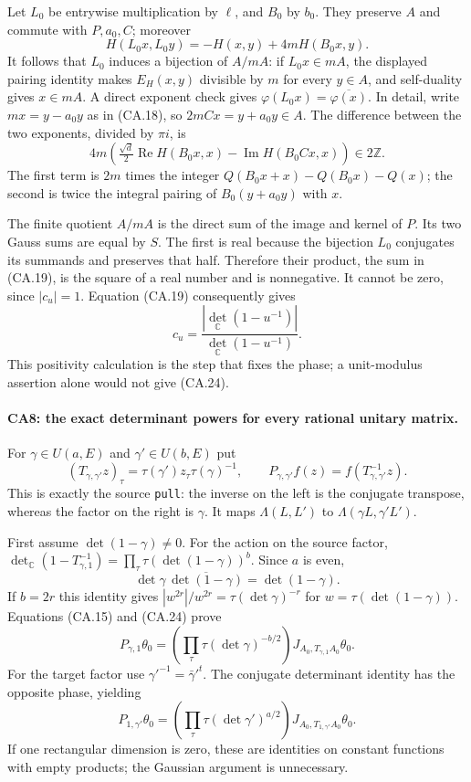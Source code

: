 Let $L_0$ be entrywise multiplication by $\ell$, and $B_0$ by $b_0$.
They preserve $A$ and commute with $P,a_0,C$; moreover
\[
 H(L_0x,L_0y)=-H(x,y)+4mH(B_0x,y).
\]
It follows that $L_0$ induces a bijection of $A/mA$: if
$L_0x\in mA$, the displayed pairing identity makes
$E_H(x,y)$ divisible by $m$ for every $y\in A$, and self-duality
gives $x\in mA$. A direct exponent check gives
$\varphi(L_0x)=\overline{\varphi(x)}$. In detail, write
$mx=y-a_0y$ as in (CA.18), so $2mCx=y+a_0y\in A$.
The difference between the two exponents, divided by $\pi i$, is
\[
 4m\left(\tfrac{\sqrt d}{2}\operatorname{Re}H(B_0x,x)
                 -\operatorname{Im}H(B_0Cx,x)\right)\in2\mathbb Z.
\]
The first term is $2m$ times the integer
$Q(B_0x+x)-Q(B_0x)-Q(x)$; the second is twice the integral
pairing of $B_0(y+a_0y)$ with $x$.

The finite quotient $A/mA$ is the direct sum of the image and
kernel of $P$. Its two Gauss sums are equal by $S$. The first is
real because the bijection $L_0$ conjugates its summands and
preserves that half. Therefore their product, the sum in (CA.19),
is the square of a real number and is nonnegative. It cannot be
zero, since $|c_u|=1$. Equation (CA.19) consequently gives
\[
 c_u=\frac{|\det_{\mathbb C}(1-u^{-1})|}
               {\det_{\mathbb C}(1-u^{-1})}.
 \tag{CA.24}
\]
This positivity calculation is the step that fixes the phase; a
unit-modulus assertion alone would not give (CA.24).

\paragraph{CA8: the exact determinant powers for every rational unitary matrix.}
For $\gamma\in U(a,E)$ and $\gamma'\in U(b,E)$ put
\[
 (T_{\gamma,\gamma'}z)_\tau
       =\tau(\gamma')z_\tau\tau(\gamma)^{-1},\qquad
 P_{\gamma,\gamma'}f(z)=f(T_{\gamma,\gamma'}^{-1}z).
 \tag{CA.25}
\]
This is exactly the source \texttt{pull}: the inverse on the left
is the conjugate transpose, whereas the factor on the right is
$\gamma$. It maps $\Lambda(L,L')$ to
$\Lambda(\gamma L,\gamma'L')$.

First assume $\det(1-\gamma)\ne0$. For the action on the source
factor, $\det_{\mathbb C}(1-T_{\gamma,1}^{-1})
=\prod_\tau\tau(\det(1-\gamma))^b$. Since $a$ is even,
\[
 \det\gamma\,\overline{\det(1-\gamma)}=\det(1-\gamma).
\]
If $b=2r$ this identity gives
$|w^{2r}|/w^{2r}=\tau(\det\gamma)^{-r}$ for
$w=\tau(\det(1-\gamma))$. Equations (CA.15) and (CA.24) prove
\[
 P_{\gamma,1}\theta_0
   =\left(\prod_\tau\tau(\det\gamma)^{-b/2}\right)
       J_{A_0,T_{\gamma,1}A_0}\theta_0.
 \tag{CA.26}
\]
For the target factor use $\gamma'^{-1}=\bar\gamma'^{t}$.
The conjugate determinant identity has the opposite phase, yielding
\[
 P_{1,\gamma'}\theta_0
   =\left(\prod_\tau\tau(\det\gamma')^{a/2}\right)
       J_{A_0,T_{1,\gamma'}A_0}\theta_0.
 \tag{CA.27}
\]
If one rectangular dimension is zero, these are identities on
constant functions with empty products; the Gaussian argument is
unnecessary.

